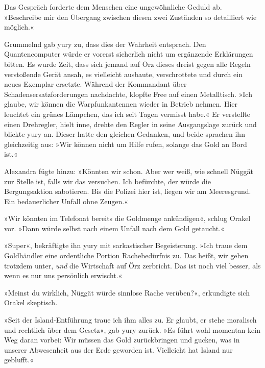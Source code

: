 
Das Gespräch forderte dem Menschen eine ungewöhnliche Geduld ab. »Beschreibe mir den Übergang zwischen diesen zwei Zuständen so detailliert wie möglich.«


Grummelnd gab yury zu, dass dies der Wahrheit entsprach. Den Quantencomputer würde er vorerst sicherlich nicht um ergänzende Erklärungen bitten. Es wurde Zeit, dass sich jemand auf Örz dieses dreist gegen alle Regeln verstoßende Gerät ansah, es vielleicht ausbaute, verschrottete und durch ein neues Exemplar ersetzte. Während der Kommandant über Schadensersatzforderungen nachdachte, klopfte Free auf einen Metalltisch. »Ich glaube, wir können die Warpfunkantennen wieder in Betrieb nehmen. Hier leuchtet ein grünes Lämpchen, das ich seit Tagen vermisst habe.« Er verstellte einen Drehregler, hielt inne, drehte den Regler in seine Ausgangslage zurück und blickte yury an. Dieser hatte den gleichen Gedanken, und beide sprachen ihn gleichzeitig aus: »Wir können nicht um Hilfe rufen, solange das Gold an Bord ist.«

Alexandra fügte hinzu: »Könnten wir schon. Aber wer weiß, wie schnell Nüggät zur Stelle ist, falls wir das versuchen. Ich befürchte, der würde die Bergungsaktion sabotieren. Bis die Polizei hier ist, liegen wir am Meeresgrund. Ein bedauerlicher Unfall ohne Zeugen.«

»Wir könnten im Telefonat bereits die Goldmenge ankündigen«, schlug Orakel vor. »Dann würde selbst nach einem Unfall nach dem Gold getaucht.«

»Super«, bekräftigte ihn yury mit sarkastischer Begeisterung. »Ich traue dem Goldhändler eine ordentliche Portion Rachebedürfnis zu. Das heißt, wir gehen trotzdem unter, \emph{und} die Wirtschaft auf Örz zerbricht. Das ist noch viel besser, als wenn es nur uns persönlich erwischt.«

»Meinst du wirklich, Nüggät würde sinnlose Rache verüben?«, erkundigte sich Orakel skeptisch.

»Seit der Island-Entführung traue ich ihm alles zu. Er glaubt, er stehe moralisch und rechtlich über dem Gesetz«, gab yury zurück. »Es führt wohl momentan kein Weg daran vorbei: Wir müssen das Gold zurückbringen und gucken, was in unserer Abwesenheit aus der Erde geworden ist. Vielleicht hat Island nur geblufft.«

